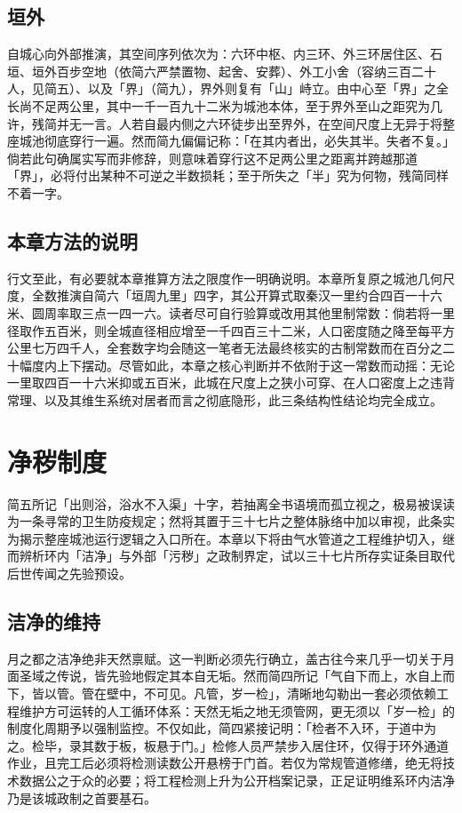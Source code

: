 \section{垣外}

自城心向外部推演，其空间序列依次为：六环中枢、内三环、外三环居住区、石垣、垣外百步空地（依简六严禁置物、起舍、安葬）、外工小舍（容纳三百二十人，见简五）、以及「界」（简九），界外则复有「山」峙立。由中心至「界」之全长尚不足两公里，其中一千一百九十二米为城池本体，至于界外至山之距究为几许，残简并无一言。人若自最内侧之六环徒步出至界外，在空间尺度上无异于将整座城池彻底穿行一遍。然而简九偏偏记称：「在其内者出，必失其半。失者不复。」倘若此句确属实写而非修辞，则意味着穿行这不足两公里之距离并跨越那道「界」，必将付出某种不可逆之半数损耗；至于所失之「半」究为何物，残简同样不着一字。

\section{本章方法的说明}

行文至此，有必要就本章推算方法之限度作一明确说明。本章所复原之城池几何尺度，全数推演自简六「垣周九里」四字，其公开算式取秦汉一里约合四百一十六米、圆周率取三点一四一六。读者尽可自行验算或改用其他里制常数：倘若将一里径取作五百米，则全城直径相应增至一千四百三十二米，人口密度随之降至每平方公里七万四千人，全套数字均会随这一笔者无法最终核实的古制常数而在百分之二十幅度内上下摆动。尽管如此，本章之核心判断并不依附于这一常数而动摇：无论一里取四百一十六米抑或五百米，此城在尺度上之狭小可穿、在人口密度上之违背常理、以及其维生系统对居者而言之彻底隐形，此三条结构性结论均完全成立。

\chapter{净秽制度}

简五所记「出则浴，浴水不入渠」十字，若抽离全书语境而孤立视之，极易被误读为一条寻常的卫生防疫规定；然将其置于三十七片之整体脉络中加以审视，此条实为揭示整座城池运行逻辑之入口所在。本章以下将由气水管道之工程维护切入，继而辨析环内「洁净」与外部「污秽」之政制界定，试以三十七片所存实证条目取代后世传闻之先验预设。

\section{洁净的维持}

月之都之洁净绝非天然禀赋。这一判断必须先行确立，盖古往今来几乎一切关于月面圣域之传说，皆先验地假定其本自无垢。然而简四所记「气自下而上，水自上而下，皆以管。管在壁中，不可见。凡管，岁一检」，清晰地勾勒出一套必须依赖工程维护方可运转的人工循环体系：天然无垢之地无须管网，更无须以「岁一检」的制度化周期予以强制监控。不仅如此，简四紧接记明：「检者不入环，于道中为之。检毕，录其数于板，板悬于门。」检修人员严禁步入居住环，仅得于环外通道作业，且完工后必须将检测读数公开悬榜于门首。若仅为常规管道修缮，绝无将技术数据公之于众的必要；将工程检测上升为公开档案记录，正足证明维系环内洁净乃是该城政制之首要基石。

